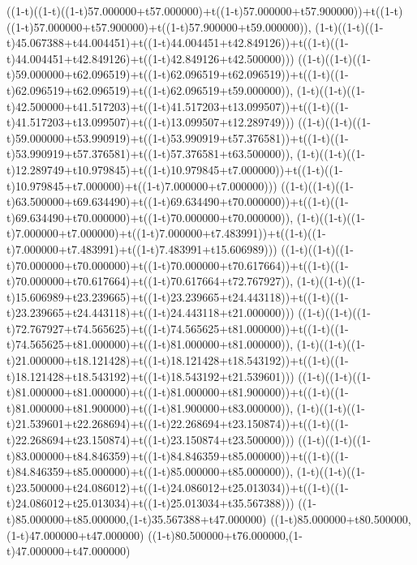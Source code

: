 ((1-t)((1-t)((1-t)57.000000+t57.000000)+t((1-t)57.000000+t57.900000))+t((1-t)((1-t)57.000000+t57.900000)+t((1-t)57.900000+t59.000000)),                                     (1-t)((1-t)((1-t)45.067388+t44.004451)+t((1-t)44.004451+t42.849126))+t((1-t)((1-t)44.004451+t42.849126)+t((1-t)42.849126+t42.500000)))
((1-t)((1-t)((1-t)59.000000+t62.096519)+t((1-t)62.096519+t62.096519))+t((1-t)((1-t)62.096519+t62.096519)+t((1-t)62.096519+t59.000000)),                                     (1-t)((1-t)((1-t)42.500000+t41.517203)+t((1-t)41.517203+t13.099507))+t((1-t)((1-t)41.517203+t13.099507)+t((1-t)13.099507+t12.289749)))
((1-t)((1-t)((1-t)59.000000+t53.990919)+t((1-t)53.990919+t57.376581))+t((1-t)((1-t)53.990919+t57.376581)+t((1-t)57.376581+t63.500000)),                                     (1-t)((1-t)((1-t)12.289749+t10.979845)+t((1-t)10.979845+t7.000000))+t((1-t)((1-t)10.979845+t7.000000)+t((1-t)7.000000+t7.000000)))
((1-t)((1-t)((1-t)63.500000+t69.634490)+t((1-t)69.634490+t70.000000))+t((1-t)((1-t)69.634490+t70.000000)+t((1-t)70.000000+t70.000000)),                                     (1-t)((1-t)((1-t)7.000000+t7.000000)+t((1-t)7.000000+t7.483991))+t((1-t)((1-t)7.000000+t7.483991)+t((1-t)7.483991+t15.606989)))
((1-t)((1-t)((1-t)70.000000+t70.000000)+t((1-t)70.000000+t70.617664))+t((1-t)((1-t)70.000000+t70.617664)+t((1-t)70.617664+t72.767927)),                                     (1-t)((1-t)((1-t)15.606989+t23.239665)+t((1-t)23.239665+t24.443118))+t((1-t)((1-t)23.239665+t24.443118)+t((1-t)24.443118+t21.000000)))
((1-t)((1-t)((1-t)72.767927+t74.565625)+t((1-t)74.565625+t81.000000))+t((1-t)((1-t)74.565625+t81.000000)+t((1-t)81.000000+t81.000000)),                                     (1-t)((1-t)((1-t)21.000000+t18.121428)+t((1-t)18.121428+t18.543192))+t((1-t)((1-t)18.121428+t18.543192)+t((1-t)18.543192+t21.539601)))
((1-t)((1-t)((1-t)81.000000+t81.000000)+t((1-t)81.000000+t81.900000))+t((1-t)((1-t)81.000000+t81.900000)+t((1-t)81.900000+t83.000000)),                                     (1-t)((1-t)((1-t)21.539601+t22.268694)+t((1-t)22.268694+t23.150874))+t((1-t)((1-t)22.268694+t23.150874)+t((1-t)23.150874+t23.500000)))
((1-t)((1-t)((1-t)83.000000+t84.846359)+t((1-t)84.846359+t85.000000))+t((1-t)((1-t)84.846359+t85.000000)+t((1-t)85.000000+t85.000000)),                                     (1-t)((1-t)((1-t)23.500000+t24.086012)+t((1-t)24.086012+t25.013034))+t((1-t)((1-t)24.086012+t25.013034)+t((1-t)25.013034+t35.567388)))
((1-t)85.000000+t85.000000,(1-t)35.567388+t47.000000)
((1-t)85.000000+t80.500000,(1-t)47.000000+t47.000000)
((1-t)80.500000+t76.000000,(1-t)47.000000+t47.000000)
